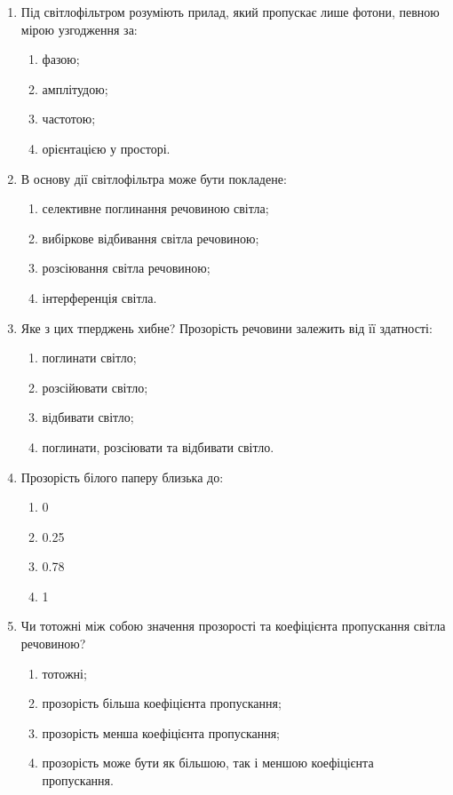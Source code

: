 \documentclass[onecolumn]{el-author}
\begin{document}
\begin{enumerate}
	\item  Під світлофільтром розуміють прилад, який пропускає лише фотони,
певною мірою узгодження за:
	\begin{enumerate}
		\item фазою;
		\item амплітудою;
		\item частотою;
		\item орієнтацією у просторі.
	\end{enumerate}
	\item  В основу дії світлофільтра може бути покладене:
	\begin{enumerate}
		\item селективне поглинання речовиною світла;
		\item вибіркове відбивання світла речовиною;
		\item  розсіювання світла речовиною;
		\item інтерференція світла.
	\end{enumerate}
	\item Яке з цих тперджень хибне? Прозорість речовини залежить від її здатності:
	\begin{enumerate}
		\item поглинати світло;
		\item розсійювати світло;
		\item відбивати світло;
		\item поглинати, розсіювати та відбивати світло.
	\end{enumerate}
	\item Прозорість білого паперу близька до:
	\begin{enumerate}
		\item 0
		\item 0.25
		\item 0.78
		\item 1
	\end{enumerate}
	\item Чи тотожні між собою значення прозорості та коефіцієнта
пропускання світла речовиною?
	\begin{enumerate}
		\item тотожні;
		\item прозорість більша коефіцієнта пропускання;
		\item прозорість менша коефіцієнта пропускання;
		\item прозорість може бути як більшою, так і меншою коефіцієнта
пропускання.
	\end{enumerate}

\end{enumerate}
\end{document}
